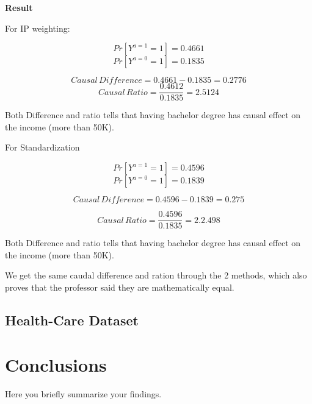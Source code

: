 \documentclass[letterpaper,12pt]{article}
\begin{document}
\textbf{Result}

For IP weighting:

$$
Pr[Y^{a=1}=1]=0.4661
$$
$$
Pr[Y^{a=0}=1]=0.1835
$$

$$Causal\,Difference = 0.4661-0.1835=0.2776$$
$$Causal\,Ratio= \frac{0.4612}{0.1835}=2.5124$$
\par
Both Difference and ratio tells that having bachelor degree has causal effect on  the income (more than 50K). \par


For  Standardization


$$Pr[Y^{a=1}=1]=0.4596$$
$$Pr[Y^{a=0}=1]=0.1839$$

$$Causal\,Difference = 0.4596-0.1839=0.275$$

$$Causal\, Ratio= \frac{0.4596}{0.1835}=2. 2.498$$ 

Both Difference and ratio tells that having bachelor degree has causal effect on  the income (more than 50K).


We get the same caudal difference and ration through the 2 methods, which also proves that the professor said they are mathematically equal.

\subsection{Health-Care Dataset}


\section{Conclusions}
Here you briefly summarize your findings.






\newpage
\end{document}
